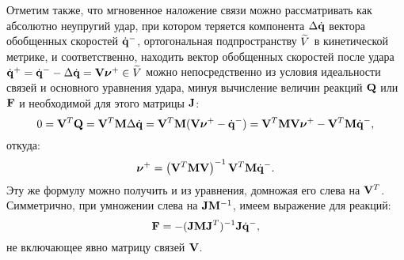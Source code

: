 Отметим также, что мгновенное наложение связи можно рассматривать как абсолютно неупругий удар, при котором теряется компонента $\Delta\dot{\mathbf{q}}$ вектора обобщенных скоростей $\dot{\mathbf{q}}^-$, ортогональная подпространству $\widetilde{V}$ в кинетической метрике, и соответственно, находить вектор обобщенных скоростей после удара $\dot{\mathbf{q}}^+ = \dot{\mathbf{q}}^- - \Delta\dot{\mathbf{q}} = \mathbf{V}\boldsymbol{\mathbf{\nu}}^+ \in \widetilde{V}$ можно непосредственно из условия идеальности связей и основного уравнения удара, минуя вычисление величин реакций $\mathbf{Q}$ или $\mathbf{F}$ и необходимой для этого матрицы $\mathbf{J}$:
\begin{equation*}
    0 = \mathbf{V}^T\mathbf{Q} = \mathbf{V}^T\mathbf{M}\Delta\dot{\mathbf{q}} = \mathbf{V}^T\mathbf{M}(\mathbf{V}\boldsymbol{\mathbf{\nu}}^+ - \dot{\mathbf{q}}^-) = \mathbf{V}^T\mathbf{M}\mathbf{V}\boldsymbol{\mathbf{\nu}}^+ - \mathbf{V}^T\mathbf{M}\dot{\mathbf{q}}^-,
\end{equation*}
откуда:
\begin{equation*}
\boldsymbol{\mathbf{\nu}}^+ = \left( \mathbf{V}^T\mathbf{M}\mathbf{V} \right)^{-1}\mathbf{V}^T\mathbf{M}\dot{\mathbf{q}}^-.
\end{equation*}
Эту же формулу можно получить и из уравнения, домножая его слева на $\mathbf{V}^T$. Симметрично, при умножении слева на $\mathbf{J}\mathbf{M}^{-1}$, имеем выражение для реакций:
\begin{equation*}
    \mathbf{F} = -(\mathbf{J} \mathbf{M} \mathbf{J}^T)^{-1}\mathbf{J}\dot{\mathbf{q}}^-,
\end{equation*}
не включающее явно матрицу связей $\mathbf{V}$.
